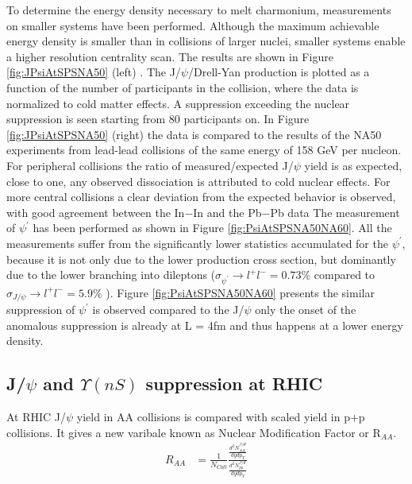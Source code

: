 To determine the energy density necessary to melt charmonium, measurements on smaller 
systems have been performed. Although the maximum achievable energy density is smaller 
than in collisions of larger nuclei, smaller systems enable a higher resolution centrality 
scan. The results are shown in Figure \ref{fig:JPsiAtSPSNA50} (left) \cite{Scomparin}. 
The J/$\psi$/Drell-Yan production is plotted as a function of
the number of participants in the collision, where the data is normalized to cold
matter effects. A suppression exceeding the nuclear suppression is seen starting from 80 
participants on. In Figure \ref{fig:JPsiAtSPSNA50} (right) the data is compared to the
results of the NA50 experiments from lead-lead collisions of the same energy of
158 GeV per nucleon. For peripheral collisions the ratio of measured/expected
J/$\psi$ yield is as expected, close to one, any observed dissociation is attributed
to cold nuclear effects. For more central collisions a clear deviation from the
expected behavior is observed, with good agreement between the In$-$In and the
Pb$-$Pb data
The measurement of $\psi^{'}$ has been performed as shown in Figure \ref{fig:PsiAtSPSNA50NA60}. All
the measurements suffer from the significantly lower statistics accumulated
for the $\psi^{'}$, because it is not only due to the lower production cross section,
but dominantly due to the lower branching into dileptons ($\sigma_{\psi^{'}} \rightarrow l^{+}l^{-}= 0.73 \%$
compared to $\sigma_{J/\psi} \rightarrow l^{+}l^{-}= 5.9 \%$ ).
Figure \ref{fig:PsiAtSPSNA50NA60} presents the similar suppression of $\psi^{'}$ is observed compared to
the J/$\psi$ only the onset of the anomalous suppression is already at L = 4fm
and thus happens at a lower energy density.

\subsection{J/$\psi$ and $\Upsilon(nS)$ suppression at RHIC}
At RHIC J/$\psi$ yield in AA collisions is compared with scaled yield in p+p collisions. 
It gives a new varibale known as Nuclear Modification Factor or R$_{AA}$.
\begin{eqnarray}
R_{AA} &= \frac{1}{N_{Coll}} \frac{\frac{d^{2}N^{J/\Psi}_{AA}}{dy dp_{T}}}{ \frac{d^{2}N^{J/\Psi}_{pp}}{dy dp_{T}}} \\
\end{eqnarray}

